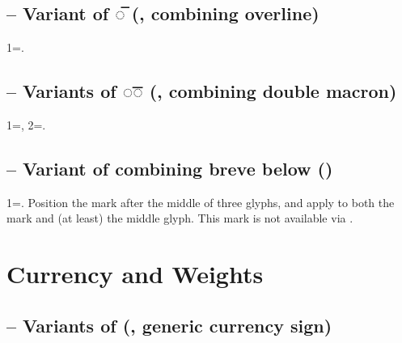 \subsection{ – Variant of ◌̅ (,
combining overline)}
1=.

\subsection{ – Variants of ◌͞◌ (, combining double macron)}
1=, 2=.

\subsection{ – Variant of combining breve below ()}
1=. Position the mark after the middle of three glyphs, and apply 
to both the mark and (at least) the middle glyph. This mark is not available via .

\section{Currency and Weights}
\subsection{ – Variants of {\textcurrency} (, generic
currency sign)}

